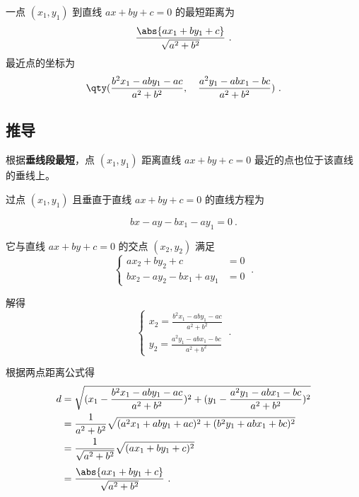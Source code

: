 
\begin{issues}
\issueDraft
\end{issues}

一点 $(x_1,y_1)$ 到直线 $ax + by + c = 0$ 的最短距离为
\begin{equation}
\frac{\abs{ax_1 + by_1 + c}}{\sqrt{a^2 + b^2}}~.
\end{equation}
最近点的坐标为
\begin{equation}
\qty(
\frac{b^2x_1 - aby_1 - ac}{a^2 + b^2}, \quad
\frac{a^2y_1 - abx_1 - bc}{a^2 + b^2})~.
\end{equation}

\subsection{推导}

根据\textbf{垂线段最短}，点 $(x_1, y_1)$ 距离直线 $ax + by + c = 0$ 最近的点也位于该直线的垂线上。

过点 $(x_1, y_1)$ 且垂直于直线 $ax+by+c=0$ 的直线方程为

\begin{equation}
bx - ay - bx_1 - ay_1 = 0~.
\end{equation}

它与直线 $ax + by + c = 0$ 的交点 $(x_2, y_2)$ 满足
\begin{equation}
\left\lbrace
\begin{aligned}
ax_2 + by_2 + c &= 0\\
bx_2 - ay_2-bx_1 + ay_1 &= 0
\end{aligned}~.
\right.
\end{equation}

解得
\begin{equation}
\left\lbrace
\begin{aligned}
x_2=\frac{b^2x_1 - aby_1 - ac}{a^2 + b^2}\\
y_2=\frac{a^2y_1 - abx_1 - bc}{a^2 + b^2}
\end{aligned}~.
\right.
\end{equation}

根据两点距离公式得
\begin{equation}
\begin{split}
d&=\sqrt{(x_1-\frac{b^2x_1 - aby_1 - ac}{a^2 + b^2})^2 + (y_1-\frac{a^2y_1 - abx_1 - bc}{a^2 + b^2})^2}\\
&=\frac{1}{a^2 + b^2}\sqrt{(a^2x_1 + aby_1 + ac)^2 + (b^2y_1 + abx_1 + bc)^2}\\
&=\frac{1}{\sqrt{a^2 + b^2}}\sqrt{(ax_1 + by_1 + c)^2}\\[3pt]
&=\frac{\abs{ax_1 + by_1 + c}}{\sqrt{a^2 + b^2}}~.\\
\end{split}
\end{equation}

